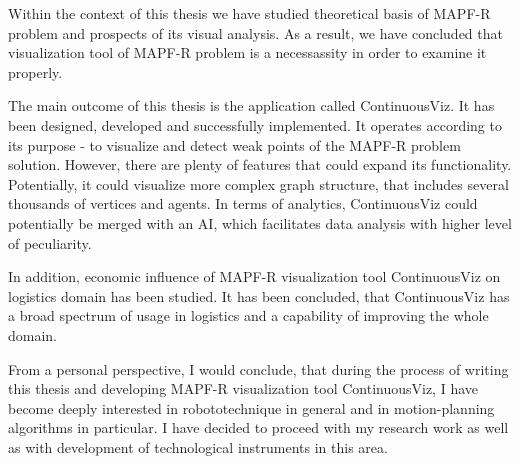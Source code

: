 \documentclass[thesis=B,english]{FITthesis}[2019/12/23]
\begin{document}
\begin{conclusion}
	
Within the context of this thesis we have studied theoretical basis of MAPF-R problem and prospects of its visual analysis. As a result, we have concluded that  visualization tool of MAPF-R problem is a necessassity in order to examine it properly.

The main outcome of this thesis is the application called ContinuousViz. It has been designed, developed and successfully implemented. It operates according to its purpose - to visualize and detect weak points of the MAPF-R problem solution.  However, there are plenty of features that could expand its functionality. Potentially, it could visualize more complex graph structure, that includes several thousands of vertices and agents. In terms of analytics, ContinuousViz could potentially be merged with an AI, which facilitates data analysis with higher level of peculiarity. 

In addition, economic influence of MAPF-R visualization tool ContinuousViz on logistics domain has been studied. It has been concluded, that ContinuousViz has a broad spectrum of usage in logistics and a capability of improving the whole domain.

From a personal perspective, I would conclude, that during the process of writing this thesis and developing MAPF-R visualization tool ContinuousViz, I have become deeply interested in robototechnique in general and in motion-planning algorithms in particular. I have decided to proceed with my research work as well as with development of technological instruments in this area.

\end{conclusion}



\end{document}
